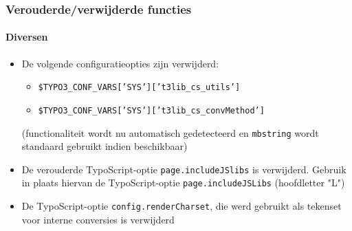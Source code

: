 \begin{frame}[fragile]
	\frametitle{Verouderde/verwijderde functies}
	\framesubtitle{Diversen}

	\begin{itemize}

		\item De volgende configuratieopties zijn verwijderd:

			\begin{itemize}
				\item \texttt{\$TYPO3\_CONF\_VARS['SYS']['t3lib\_cs\_utils']}
				\item \texttt{\$TYPO3\_CONF\_VARS['SYS']['t3lib\_cs\_convMethod']}
			\end{itemize}

			\small
				(functionaliteit wordt nu automatisch gedetecteerd en \texttt{mbstring} wordt
				standaard gebruikt indien beschikbaar)
			\normalsize

		\item De verouderde TypoScript-optie \texttt{page.includeJSlibs} is
			verwijderd. Gebruik in plaats hiervan de TypoScript-optie \texttt{page.includeJSLibs}
			(hoofdletter "L")

		\item De TypoScript-optie \texttt{config.renderCharset}, die werd gebruikt
			als tekenset voor interne conversies is verwijderd

	\end{itemize}

\end{frame}


